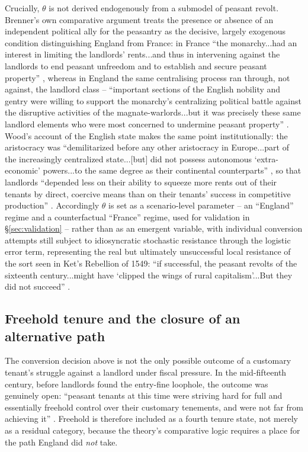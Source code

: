 \documentclass[11pt,english]{article}
\begin{document}
Crucially, $\theta$ is not derived endogenously from a submodel of peasant revolt. Brenner's own comparative argument treats the presence or absence of an independent political ally for the peasantry as the decisive, largely exogenous condition distinguishing England from France: in France ``the monarchy...had an interest in limiting the landlords' rents...and thus in intervening against the landlords to end peasant unfreedom and to establish and secure peasant property'' \cite[p.69]{brenner1976agrarian}, whereas in England the same centralising process ran through, not against, the landlord class -- ``important sections of the English nobility and gentry were willing to support the monarchy's centralizing political battle against the disruptive activities of the magnate-warlords...but it was precisely these same landlord elements who were most concerned to undermine peasant property'' \cite[p.71-72]{brenner1976agrarian}. Wood's account of the English state makes the same point institutionally: the aristocracy was ``demilitarized before any other aristocracy in Europe...part of the increasingly centralized state...[but] did not possess autonomous `extra-economic' powers...to the same degree as their continental counterparts'' \cite[p.99]{wood2002origin}, so that landlords ``depended less on their ability to squeeze more rents out of their tenants by direct, coercive means than on their tenants' success in competitive production'' \cite[p.100]{wood2002origin}. Accordingly $\theta$ is set as a scenario-level parameter -- an ``England'' regime and a counterfactual ``France'' regime, used for validation in \S\ref{sec:validation} -- rather than as an emergent variable, with individual conversion attempts still subject to idiosyncratic stochastic resistance through the logistic error term, representing the real but ultimately unsuccessful local resistance of the sort seen in Ket's Rebellion of 1549: ``if successful, the peasant revolts of the sixteenth century...might have `clipped the wings of rural capitalism'...But they did not succeed'' \cite[p.62-63]{brenner1976agrarian}.

\subsection{Freehold tenure and the closure of an alternative path}
\label{sec:freehold}

The conversion decision above is not the only possible outcome of a customary tenant's struggle against a landlord under fiscal pressure. In the mid-fifteenth century, before landlords found the entry-fine loophole, the outcome was genuinely open: ``peasant tenants at this time were striving hard for full and essentially freehold control over their customary tenements, and were not far from achieving it'' \cite[p.61]{brenner1976agrarian}. Freehold is therefore included as a fourth tenure state, not merely as a residual category, because the theory's comparative logic requires a place for the path England did \emph{not} take.
\end{document}
